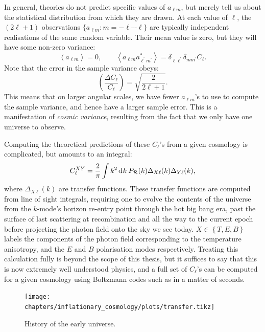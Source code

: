 In general, theories do not predict specific values of \(a_{\ell m}\), but merely tell us about the statistical distribution from which they are drawn. At each value of \(\ell\), the \((2\ell + 1)\) observations \(\{a_{\ell m}:m=-\ell\cdots\ell\}\) are typically independent realisations of the same random variable. Their mean value is zero, but they will have some non-zero variance:
\begin{equation}
  \left\langle a_{\ell m} \right\rangle = 0, \qquad
  \left\langle a_{\ell m} a_{\ell^\prime m^\prime}^\ast\right\rangle = \delta_{\ell \ell^\prime} \delta_{m m^\prime} C_\ell.
\end{equation}
Note that the error in the sample variance obeys:
\begin{equation}
  \left( \frac{\Delta C_\ell}{C_\ell} \right) = \sqrt{\frac{2}{2\ell+1}}.
\end{equation}
This means that on larger angular scales, we have fewer \(a_{\ell m}\)'s to use to compute the sample variance, and hence have a larger sample error. This is a manifestation of {\em cosmic variance}, resulting from the fact that we only have one universe to observe. 

Computing the theoretical predictions of these \(C_\ell\)'s from a given cosmology is complicated, but amounts to an integral:
\begin{equation}
    C_\ell^{XY} = \frac{2}{\pi}\int k^2 \operatorname{d}^{}\!{k} \: P_\mathcal{R}(k) \Delta_{X\ell}(k)\Delta_{Y\ell}(k),
\end{equation}
where \(\Delta_{X\ell}(k)\) are transfer functions. These transfer functions are computed from line of sight integrals, requiring one to evolve the contents of the universe from the \(k\)-mode's horizon re-entry point through the hot big bang era, past the surface of last scattering at recombination and all the way to the current epoch before projecting the photon field onto the sky we see today. 
 \({X\in\left\{ T,E,B \right\}}\) labels the components of the photon field corresponding to the temperature anisotropy, and the \(E\) and \(B\) polarisation modes respectively.
Treating this calculation fully is beyond the scope of this thesis, but it suffices to say that this is now extremely well understood physics, and a full set of \(C_\ell\)'s can be computed for a given cosmology using Boltzmann codes such as \CAMB{} \citep{CAMB} in a matter of seconds.


\begin{figure}[tp]
  \centering
  \texttt{[image: chapters/inflationary\_cosmology/plots/transfer.tikz]}
  \caption{History of the early universe.}\label{fig:cos:transfer}
\end{figure}


